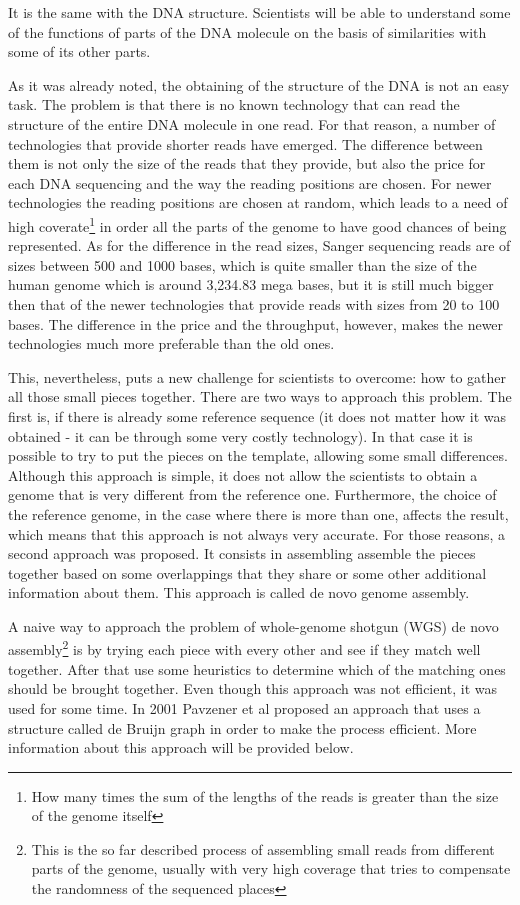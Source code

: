 \documentclass[11pt]{article}
\begin{document}
It is the same with the DNA structure. Scientists will be able to understand
some of the functions of parts of the DNA molecule on the basis of similarities 
with some of its other parts.

As it was already noted, the obtaining of the structure of the DNA is not an
easy task. The problem is that there is no known technology that can read the
structure of the entire DNA molecule in one read. For that reason, a number of
technologies that provide shorter reads have emerged. The difference between
them is not only the size of the reads that they provide, but also the price for
each DNA sequencing and the way the reading positions are chosen. For newer technologies
the reading positions are chosen at random, which leads to a need of high coverate\footnote{
How many times the sum of the lengths of the reads is greater than the size of the 
genome itself} in order all the parts of the genome to have good chances of being represented.
As for the difference in the read sizes, Sanger sequencing reads are of sizes between
500 and 1000 bases, which is quite smaller than the size of the human genome which
is around 3,234.83 mega bases, but it is still much bigger then that of the
newer technologies that provide reads with sizes from 20 to 100 bases. The
difference in the price and the throughput, however, makes the newer technologies
much more preferable than the old ones.

This, nevertheless, puts a new challenge for scientists to overcome: how to gather
all those small pieces together. There are two ways to approach this problem.
The first is, if there is already some reference sequence (it does not matter
how it was obtained - it can be through some very costly technology). In that
case it is possible to try to put the pieces on the template, allowing some
small differences. Although this approach is simple, it does not allow the scientists to
obtain a genome that is very different from the reference one. Furthermore, the
choice of the reference genome, in the case where there is more than one,
affects the result, which means that this approach is not always very accurate.
For those reasons, a second approach was proposed. It consists in assembling
assemble the pieces together based on some overlappings that they share or some
other additional information about them. This approach is called de novo genome
assembly.

A naive way to approach the problem of whole-genome shotgun (WGS) de novo
assembly\footnote{This is the so far described process of assembling small reads
from different parts of the genome, usually with very high coverage that tries
to compensate the randomness of the sequenced places} is by trying each piece
with every other and see if they match well together. After that use some
heuristics to determine which of the matching ones should be brought together.
Even though this approach was not efficient, it was used for some time. In 2001
Pavzener et al \cite{pevzner-et-all-2001} proposed an approach that uses a structure
called de Bruijn graph in order to make the process efficient. More information
about this approach will be provided below.
\end{document}
